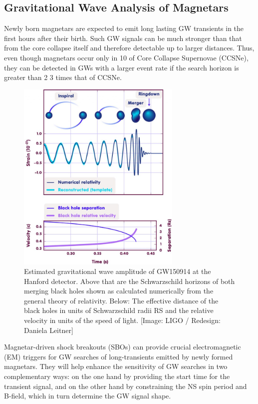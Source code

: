 \newpage

\subsection{Gravitational Wave Analysis of Magnetars}

Newly born magnetars are expected to emit long lasting GW transients in the first hours after their birth.  Such GW signals can be much stronger than that from the core collapse itself and therefore detectable up to larger distances. Thus, even though magnetars occur only in 10 of Core Collapse Supernovae (CCSNe), they can be detected in GWs with a larger event rate if the search horizon is greater than 2 3 times that of CCSNe.\\


\begin{figure}[h]
\centering
\includegraphics[height=0.8\textwidth, width=0.7\textwidth]{images/grav_wave_graph.jpg}
\caption{\small Estimated gravitational wave amplitude of GW150914 at the Hanford detector. Above that are the Schwarzschild horizons of both merging black holes shown as calculated numerically from the general theory of relativity. Below: The effective distance of the black holes in units of Schwarzschild radii RS and the relative velocity in units of the speed of light. [Image: LIGO / Redesign: Daniela Leitner]}
\end{figure}

Magnetar-driven shock breakouts (SBOs) can provide crucial electromagnetic (EM) triggers for GW searches of long-transients emitted by newly formed magnetars. They will help enhance the sensitivity of GW searches in two complementary ways: on the one hand by providing the start time for the transient signal, and on the other hand by constraining the NS spin period and B-field, which in turn determine the GW signal shape.\\


